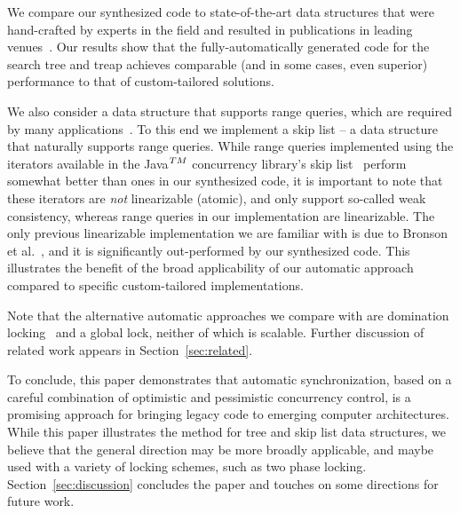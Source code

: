 We compare our synthesized code to state-of-the-art data structures
that were hand-crafted by experts in the field and resulted in publications in
leading venues~\cite{DrachslerVY2014,BronsonCCO2010}. 
Our results show that the
fully-automatically generated code for the search tree and treap
achieves comparable (and in some cases, even superior) performance to that of
custom-tailored solutions.

We also consider a data structure that supports range queries, which are required by
many applications~\cite{levelDB,FerroJKRY14}. To this end we implement a skip list -- a data structure that naturally supports range queries.
While range queries implemented using the iterators available in the Java$^{\sc TM}$ concurrency library's skip list~\cite{xxx} perform
somewhat better than ones in our synthesized code, it is important to note that these iterators are \emph{not}
linearizable (atomic), and only support so-called weak consistency, whereas range queries in our implementation are linearizable.
The only previous linearizable implementation we are familiar with is due to Bronson et al.~\cite{BronsonCCO2010},
and it is significantly out-performed by our synthesized code. 
This illustrates the benefit of the broad applicability
of our automatic approach compared to specific custom-tailored implementations.

Note that the alternative automatic approaches we compare with are domination locking~\cite{Gueta2011} and a global lock, neither of which is scalable.
Further discussion of related work appears in Section~\ref{sec:related}.

To conclude, this paper demonstrates that automatic synchronization, based on a careful combination of optimistic and
pessimistic concurrency control, is a promising approach for bringing legacy code to emerging computer architectures.
While this paper illustrates the method for tree and skip list data structures, we believe that the general direction may be more broadly applicable, and maybe used with a variety of locking schemes, such as two phase locking.
Section~\ref{sec:discussion} concludes the paper and touches on some directions for future work. 